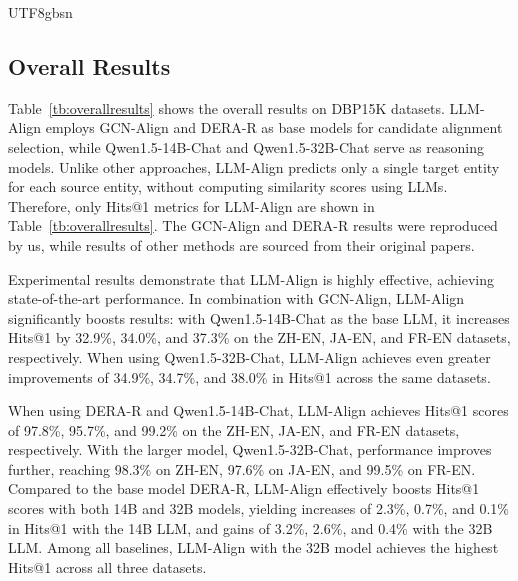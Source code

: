 \documentclass[preprint,12pt]{elsarticle}
\begin{document}
\begin{CJK}{UTF8}{gbsn}
\subsection{Overall Results}


Table~\ref{tb:overallresults} shows the overall results on DBP15K datasets. LLM-Align employs GCN-Align and DERA-R as base models for candidate alignment selection, while Qwen1.5-14B-Chat and Qwen1.5-32B-Chat serve as reasoning models. Unlike other approaches, LLM-Align predicts only a single target entity for each source entity, without computing similarity scores using LLMs. Therefore, only Hits@1 metrics for LLM-Align are shown in Table~\ref{tb:overallresults}. The GCN-Align and DERA-R results were reproduced by us, while results of other methods are sourced from their original papers.

Experimental results demonstrate that LLM-Align is highly effective, achieving state-of-the-art performance. In combination with GCN-Align, LLM-Align significantly boosts results: with Qwen1.5-14B-Chat as the base LLM, it increases Hits@1 by 32.9\%, 34.0\%, and 37.3\% on the ZH-EN, JA-EN, and FR-EN datasets, respectively. When using Qwen1.5-32B-Chat, LLM-Align achieves even greater improvements of 34.9\%, 34.7\%, and 38.0\% in Hits@1 across the same datasets.

When using DERA-R and Qwen1.5-14B-Chat, LLM-Align achieves Hits@1 scores of 97.8\%, 95.7\%, and 99.2\% on the ZH-EN, JA-EN, and FR-EN datasets, respectively. With the larger model, Qwen1.5-32B-Chat, performance improves further, reaching 98.3\% on ZH-EN, 97.6\% on JA-EN, and 99.5\% on FR-EN. Compared to the base model DERA-R, LLM-Align effectively boosts Hits@1 scores with both 14B and 32B models, yielding increases of 2.3\%, 0.7\%, and 0.1\% in Hits@1 with the 14B LLM, and gains of 3.2\%, 2.6\%, and 0.4\% with the 32B LLM. Among all baselines, LLM-Align with the 32B model achieves the highest Hits@1 across all three datasets.


\end{CJK}
\end{document}

